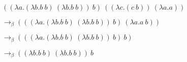 \documentclass{article}
\begin{document}
$((\lambda a.(\lambda b.b\ b)\ (\lambda b.b\ b))\ b)\ ((\lambda c.(c\ b))\ (\lambda a.a))$

$\rightarrow_\beta (((\lambda a.(\lambda b.b\ b)\ (\lambda b.b\ b))\ b)\ (\lambda a.a\ b))$

$\rightarrow_\beta (((\lambda a.(\lambda b.b\ b)\ (\lambda b.b\ b))\ b)\ b)$

$\rightarrow_\beta ((\lambda b.b\ b)\ (\lambda b.b\ b))\ b$
\end{document}

